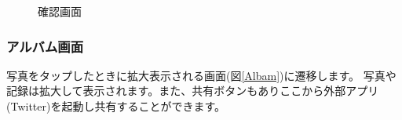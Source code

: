\documentclass[a4j]{jarticle}
\begin{document}
\begin{figure}[H]
\begin{minipage}{0.5\hsize}
\begin{center}
   \caption{確認画面}
   \label{checker}
  \end{center}
 \end{minipage}
\end{figure}

\newpage
\subsubsection{アルバム画面}
写真をタップしたときに拡大表示される画面(図\ref{Albam})に遷移します。
写真や記録は拡大して表示されます。また、共有ボタンもありここから外部アプリ(Twitter)を起動し共有することができます。
\end{document}
